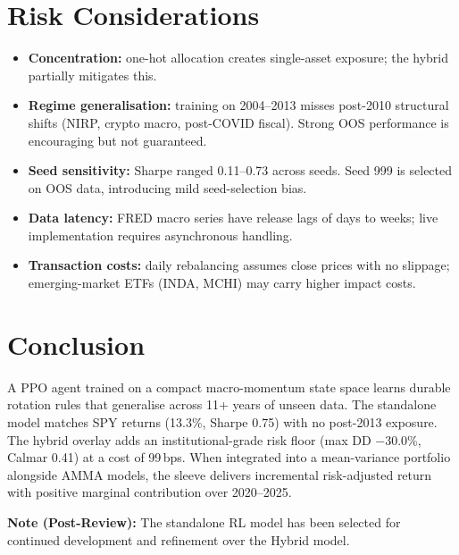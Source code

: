 \documentclass[11pt, a4paper]{article}
\begin{document}
\section{Risk Considerations}

\begin{itemize}[leftmargin=*, itemsep=0.3em]
  \item \textbf{Concentration:} one-hot allocation creates single-asset exposure; the hybrid partially mitigates this.
  \item \textbf{Regime generalisation:} training on 2004--2013 misses post-2010 structural shifts (NIRP, crypto macro, post-COVID fiscal). Strong OOS performance is encouraging but not guaranteed.
  \item \textbf{Seed sensitivity:} Sharpe ranged 0.11--0.73 across seeds. Seed 999 is selected on OOS data, introducing mild seed-selection bias.
  \item \textbf{Data latency:} FRED macro series have release lags of days to weeks; live implementation requires asynchronous handling.
  \item \textbf{Transaction costs:} daily rebalancing assumes close prices with no slippage; emerging-market ETFs (INDA, MCHI) may carry higher impact costs.
\end{itemize}

\section{Conclusion}

A PPO agent trained on a compact macro-momentum state space learns durable rotation rules that generalise across 11+ years of unseen data. The standalone model matches SPY returns (13.3\%, Sharpe 0.75) with no post-2013 exposure. The hybrid overlay adds an institutional-grade risk floor (max DD $-$30.0\%, Calmar 0.41) at a cost of 99\,bps. When integrated into a mean-variance portfolio alongside AMMA models, the sleeve delivers incremental risk-adjusted return with positive marginal contribution over 2020--2025.


\textbf{Note (Post-Review):} The standalone RL model has been 
selected for continued development and refinement over the Hybrid model. 
\end{document}
